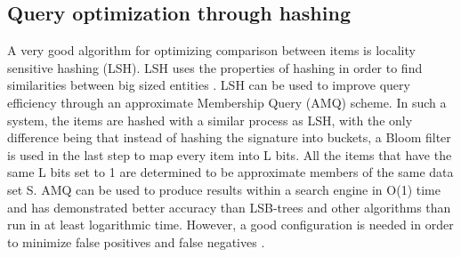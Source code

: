 \subsection{Query optimization through hashing}
A very good algorithm for optimizing comparison between items is locality sensitive hashing (LSH). LSH uses the properties of hashing in order to find similarities between big sized entities \cite{lsh}.
LSH can be used to improve query efficiency through an approximate Membership Query (AMQ) scheme. In such a system, the items are hashed with a similar process as LSH, with the only difference being that instead of hashing the signature into buckets, a Bloom filter is used in the last step to map every item into L bits. All the items that have the same L bits set to 1 are determined to be approximate members of the same data set S. AMQ can be used to produce results within a search engine in O(1) time and has demonstrated better accuracy than LSB-trees and other algorithms than run in at least logarithmic time. However, a good configuration is needed in order to minimize false positives and false negatives \cite{amq}.









